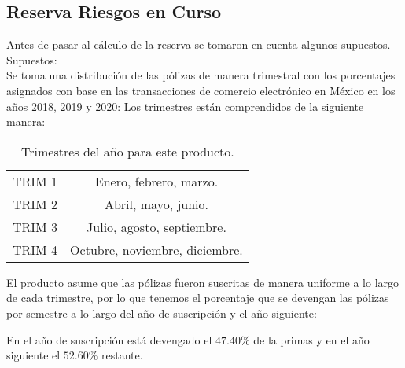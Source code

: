 \documentclass{article}
\begin{document}
\subsection*{Reserva Riesgos en Curso}
Antes de pasar al cálculo de la reserva se tomaron en cuenta algunos supuestos.\\
Supuestos:\\
Se toma una distribución de las pólizas de manera trimestral con los porcentajes asignados con base en las transacciones de comercio electrónico en México en los años 2018, 2019 y 2020:
Los trimestres están comprendidos de la siguiente manera: 
\begin{table}[H]
    \centering
    \begin{tabular}{c|c}
        TRIM 1 & Enero, febrero, marzo. \\
        TRIM 2 & Abril, mayo, junio. \\
        TRIM 3 & Julio, agosto, septiembre. \\
        TRIM 4 & Octubre, noviembre, diciembre. \\
    \end{tabular}
    \caption{Trimestres del año para este producto.}
\end{table}

El producto asume que las pólizas fueron suscritas de manera uniforme a lo largo de cada trimestre, por lo que tenemos el porcentaje que se devengan las pólizas por semestre a lo largo del año de suscripción y el año siguiente:
\begin{table}[H]
    \caption{Porcentajes con los cuales es devengada la prima.}
\end{table}
En el año de suscripción está devengado el $47.40\%$ de la primas y en el año siguiente el $52.60\%$ restante. 
\end{document}
